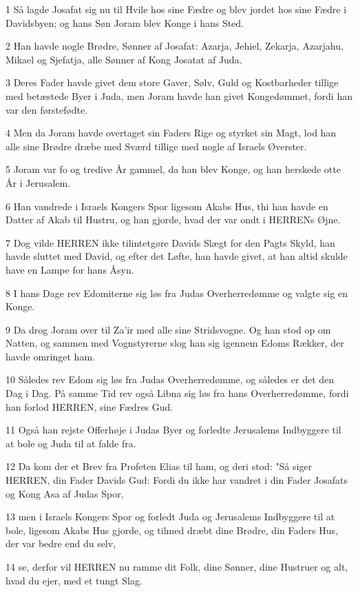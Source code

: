 \par 1 Så lagde Josafat sig nu til Hvile hos sine Fædre og blev jordet hos sine Fædre i Davidsbyen; og hans Søn Joram blev Konge i hans Sted.
\par 2 Han havde nogle Brødre, Sønner af Josafat: Azarja, Jehiel, Zekarja, Azarjahu, Mikael og Sjefatja, alle Sønner af Kong Josatat af Juda.
\par 3 Deres Fader havde givet dem store Gaver, Sølv, Guld og Kostbarheder tillige med betæstede Byer i Juda, men Joram havde han givet Kongedømmet, fordi han var den førstefødte.
\par 4 Men da Joram havde overtaget sin Faders Rige og styrket sin Magt, lod han alle sine Brødre dræbe med Sværd tillige med nogle af Israels Øverster.
\par 5 Joram var fo og tredive År gammel, da han blev Konge, og han herskede otte År i Jerusalem.
\par 6 Han vandrede i Israels Kongers Spor ligesom Akabs Hus, thi han havde en Datter af Akab til Hustru, og han gjorde, hvad der var ondt i HERRENs Øjne.
\par 7 Dog vilde HERREN ikke tilintetgøre Davids Slægt for den Pagts Skyld, han havde sluttet med David, og efter det Løfte, han havde givet, at han altid skulde have en Lampe for hans Åsyn.
\par 8 I hans Dage rev Edomiterne sig løs fra Judas Overherredømme og valgte sig en Konge.
\par 9 Da drog Joram over til Za'ir med alle sine Stridsvogne. Og han stod op om Natten, og sammen med Vognstyrerne slog han sig igennem Edoms Rækker, der havde omringet ham.
\par 10 Således rev Edom sig løs fra Judas Overherredømme, og således er det den Dag i Dag. På samme Tid rev også Libna sig løs fra hans Overherredømme, fordi han forlod HERREN, sine Fædres Gud.
\par 11 Også han rejste Offerhøje i Judas Byer og forledte Jerusalems Indbyggere til at bole og Juda til at falde fra.
\par 12 Da kom der et Brev fra Profeten Elias til ham, og deri stod: "Så siger HERREN, din Fader Davids Gud: Fordi du ikke har vandret i din Fader Josafats og Kong Asa af Judas Spor,
\par 13 men i Israels Kongers Spor og forledt Juda og Jerusalems Indbyggere til at bole, ligesom Akabs Hus gjorde, og tilmed dræbt dine Brødre, din Faders Hus, der var bedre end du selv,
\par 14 se, derfor vil HERREN nu ramme dit Folk, dine Sønner, dine Hustruer og alt, hvad du ejer, med et tungt Slag.
